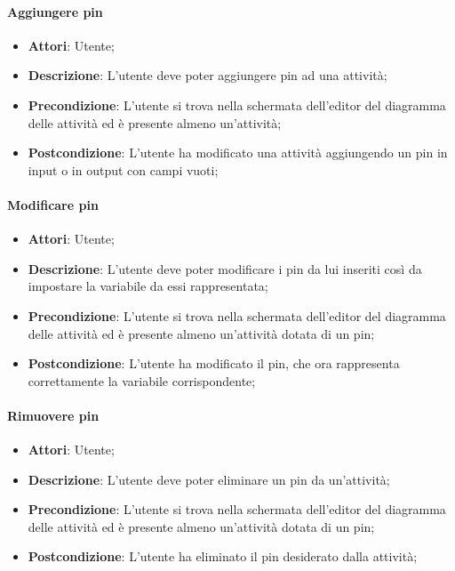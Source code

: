 


\paragraph{Aggiungere pin}
\begin{itemize}
	\item \textbf{Attori}: Utente;
	\item \textbf{Descrizione}: L’utente deve poter aggiungere pin ad una attività;
	\item \textbf{Precondizione}: L’utente si trova nella schermata dell’editor del diagramma delle attività ed è presente almeno un’attività;
	\item \textbf{Postcondizione}: L’utente ha modificato una attività aggiungendo un pin in input o in output con campi vuoti;
\end{itemize}

\paragraph{Modificare pin}
\begin{itemize}
	\item \textbf{Attori}: Utente;
	\item \textbf{Descrizione}: L’utente deve poter modificare i pin da lui inseriti così da impostare la variabile da essi rappresentata;
	\item \textbf{Precondizione}: L’utente si trova nella schermata dell’editor del diagramma delle attività ed è presente almeno un’attività dotata di un pin;
	\item \textbf{Postcondizione}: L’utente ha modificato il pin, che ora rappresenta correttamente la variabile corrispondente;
\end{itemize}

\paragraph{Rimuovere pin}
\begin{itemize}
	\item \textbf{Attori}: Utente;
	\item \textbf{Descrizione}: L’utente deve poter eliminare un pin da un’attività;
	\item \textbf{Precondizione}: L’utente si trova nella schermata dell’editor del diagramma delle attività ed è presente almeno un’attività dotata di un pin;
	\item \textbf{Postcondizione}: L’utente ha eliminato il pin desiderato dalla attività;
\end{itemize}

